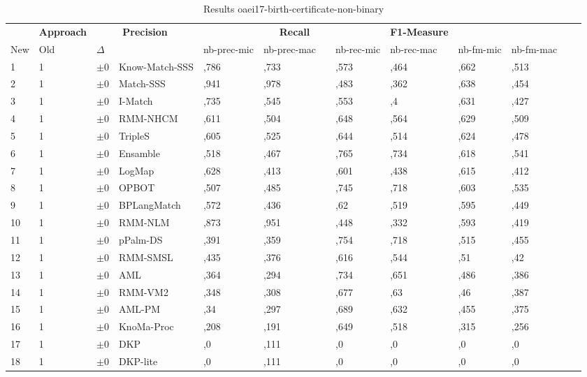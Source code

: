 \begin{table}[htb]
\setlength{\tabcolsep}{0.5em}
\centering
\scriptsize
\begin{tabular}[tb]{lllp{2.3cm}llllllllll}
\noalign{\smallskip}\hline\noalign{\smallskip}
\multicolumn{3}{c}{\textbf{Rank}}& \textbf{Approach}  & \multicolumn{2}{c}{\textbf{Precision}}  & \hspace*{1mm}  & \multicolumn{2}{c}{\textbf{Recall}}  & \hspace*{1mm}  & \multicolumn{2}{c}{\textbf{F1-Measure}}  & \hspace*{1mm} \\
New & Old & $\Delta$ & &nb-prec-mic & nb-prec-mac && nb-rec-mic & nb-rec-mac && nb-fm-mic & nb-fm-mac\\
\noalign{\smallskip}\hline\noalign{\smallskip}
1 & 1 		& $\pm$0 &Know-Match-SSS    	&	,786 & ,733 & & ,573 & ,464 & & ,662 & ,513\\
2 & 1 		& $\pm$0 &Match-SSS    	&	,941 & ,978 & & ,483 & ,362 & & ,638 & ,454\\
3 & 1 		& $\pm$0 &I-Match    	&	,735 & ,545 & & ,553 & ,4 & & ,631 & ,427\\
4 & 1 		& $\pm$0 &RMM-NHCM    	&	,611 & ,504 & & ,648 & ,564 & & ,629 & ,509\\
5 & 1 		& $\pm$0 &TripleS    	&	,605 & ,525 & & ,644 & ,514 & & ,624 & ,478\\
6 & 1 		& $\pm$0 &Ensamble    	&	,518 & ,467 & & ,765 & ,734 & & ,618 & ,541\\
7 & 1 		& $\pm$0 &LogMap    	&	,628 & ,413 & & ,601 & ,438 & & ,615 & ,412\\
8 & 1 		& $\pm$0 &OPBOT    	&	,507 & ,485 & & ,745 & ,718 & & ,603 & ,535\\
9 & 1 		& $\pm$0 &BPLangMatch    	&	,572 & ,436 & & ,62 & ,519 & & ,595 & ,449\\
10 & 1 		& $\pm$0 &RMM-NLM    	&	,873 & ,951 & & ,448 & ,332 & & ,593 & ,419\\
11 & 1 		& $\pm$0 &pPalm-DS    	&	,391 & ,359 & & ,754 & ,718 & & ,515 & ,455\\
12 & 1 		& $\pm$0 &RMM-SMSL    	&	,435 & ,376 & & ,616 & ,544 & & ,51 & ,42\\
13 & 1 		& $\pm$0 &AML    	&	,364 & ,294 & & ,734 & ,651 & & ,486 & ,386\\
14 & 1 		& $\pm$0 &RMM-VM2    	&	,348 & ,308 & & ,677 & ,63 & & ,46 & ,387\\
15 & 1 		& $\pm$0 &AML-PM    	&	,34 & ,297 & & ,689 & ,632 & & ,455 & ,375\\
16 & 1 		& $\pm$0 &KnoMa-Proc    	&	,208 & ,191 & & ,649 & ,518 & & ,315 & ,256\\
17 & 1 		& $\pm$0 &DKP    	&	,0 & ,111 & & ,0 & ,0 & & ,0 & ,0\\
18 & 1 		& $\pm$0 &DKP-lite    	&	,0 & ,111 & & ,0 & ,0 & & ,0 & ,0\\
\end{tabular}
\caption{Results oaei17-birth-certificate-non-binary}
\label{tbl:results}
\end{table}